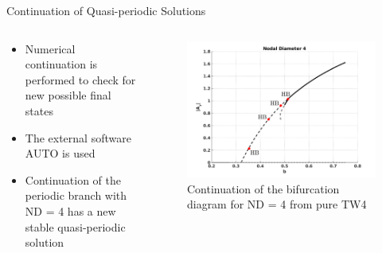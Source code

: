 \documentclass[dvipsnames, aspectratio = 169]{beamer}
\begin{document}
\begin{frame}{Continuation of Quasi-periodic Solutions}
	\begin{columns}
		\begin{column}{0.5\textwidth}
			\begin{itemize}
				\item Numerical continuation is performed to check for new possible final states
				\item The external software AUTO is used
				\item Continuation of the periodic branch with ND = 4 has a new stable quasi-periodic solution
			\end{itemize}
		\end{column}
		\begin{column}{0.5\textwidth}
			\begin{figure}[h!]
				\centering
				\includegraphics[width = 1\textwidth]{TW4_Bifurcation_newbranch.png}
				\caption{Continuation of the bifurcation diagram for ND = 4 from pure TW4}
				\label{fig:A_4fullbifurcationTW4}
			\end{figure}
		\end{column}
	\end{columns}
\end{frame}
\end{document}

